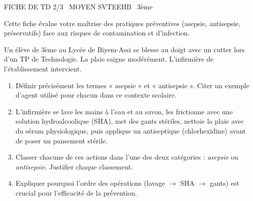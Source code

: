 \documentclass[11pt]{article}
\begin{document}
\begin{tcolorbox}[enhanced,colback=popink,colframe=popink,arc=10pt,boxrule=0pt,left=12pt,right=12pt,top=9pt,bottom=9pt]
{\color{white}\popxbold\small FICHE DE TD 2/3 \textbullet\ MOYEN \hfill SVTEEHB \textbullet\ 3ème\par}
\end{tcolorbox}
\vspace{4pt}
Cette fiche évalue votre maîtrise des pratiques préventives (asepsie, antisepsie, préservatifs) face aux risques de contamination et d'infection.

\begin{exercice}
Un élève de 3ème au Lycée de Biyem-Assi se blesse au doigt avec un cutter lors d'un TP de Technologie. La plaie saigne modérément. L'infirmière de l'établissement intervient.
\begin{enumerate}
    \item Définir précisément les termes « asepsie » et « antisepsie ». Citer un exemple d'agent utilisé pour chacun dans ce contexte scolaire.
    \item L'infirmière se lave les mains à l'eau et au savon, les frictionne avec une solution hydroalcoolique (SHA), met des gants stériles, nettoie la plaie avec du sérum physiologique, puis applique un antiseptique (chlorhexidine) avant de poser un pansement stérile.
    \item Classer chacune de ces actions dans l'une des deux catégories : \textit{asepsie} ou \textit{antisepsie}. Justifier chaque classement.
    \item Expliquer pourquoi l'ordre des opérations (lavage $\rightarrow$ SHA $\rightarrow$ gants) est crucial pour l'efficacité de la prévention.
\end{enumerate}
\end{exercice}
\end{document}

